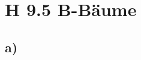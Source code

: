 \documentclass[a4paper]{article}
\begin{document}
\section*{H 9.5 B-Bäume}

\subsection*{a)}
\end{document}
